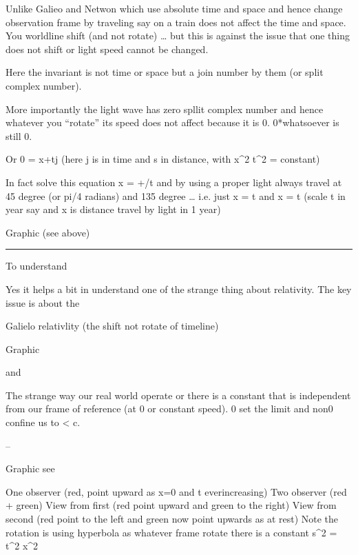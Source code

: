 \documentclass[letterpaper,10pt,english]{jupyterBook}
\begin{document}
\sphinxAtStartPar
Unlike Galieo and Netwon which use absolute time and space and hence change observation frame by traveling say on a train does not affect the time and space.  You worldline shift (and not rotate) … but this is against the issue that one thing does not shift or light speed cannot be changed.

\sphinxAtStartPar
Here the invariant is not time or space but a join number by them (or split complex number).

\sphinxAtStartPar
More importantly the light wave has zero spllit complex number and hence whatever you “rotate” its speed does not affect because it is 0.  0*whatsoever is still 0.

\sphinxAtStartPar
Or 0 = x+tj (here j is in time and s in distance, with x\textasciicircum{}2 \sphinxhyphen{} t\textasciicircum{}2 = constant)

\sphinxAtStartPar
In fact solve this equation x = +/\sphinxhyphen{}t and by using a proper light always travel at  45 degree (or pi/4 radians) and 135 degree … i.e. just x = t and x = \sphinxhyphen{}t  (scale \sphinxhyphen{} t in year say and x is distance travel by light in 1 year)

\sphinxAtStartPar
Graphic (see above)


\bigskip\hrule\bigskip


\sphinxAtStartPar
To understand

\sphinxAtStartPar
Yes it helps a bit in understand one of the strange thing about relativity.  The key issue is about the

\sphinxAtStartPar
Galielo relativlity (the shift not rotate of timeline)

\sphinxAtStartPar
Graphic

\sphinxAtStartPar
and

\sphinxAtStartPar
The strange way our real world operate or there is a constant that is independent from our frame of reference (at  0 or constant speed).  0 set the limit and non\sphinxhyphen{}0 confine us to < c.

\sphinxAtStartPar
–

\sphinxAtStartPar
Graphic see

\sphinxAtStartPar
One observer (red, point upward as x=0 and t ever\sphinxhyphen{}increasing)
Two observer (red + green)
View from first (red point upward and green to the right)
View from second (red point to the left and green now point upwards as at rest)
Note the rotation is using hyperbola as whatever frame rotate there is a constant s\textasciicircum{}2 = t\textasciicircum{}2 \sphinxhyphen{} x\textasciicircum{}2
\end{document}
